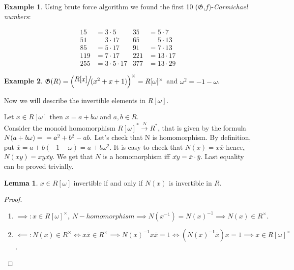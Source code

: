 \documentclass{article}
\theoremstyle{definition}
\newtheorem{example}{Example}
\theoremstyle{definition}
\newtheorem{lemma}{Lemma}
\begin{document}
\begin{example}
Using brute force algorithm we found the first 10 ($\mathfrak{G}$,$f$)-\textit{Carmichael numbers}:

$$\begin{aligned}
    15 &= 3 \cdot 5  \quad &35 &= 5 \cdot 7\\
    51 &= 3 \cdot 17 \quad &65 &= 5 \cdot 13\\
    85 &= 5 \cdot 17 \quad &91 &= 7 \cdot 13\\
    119 &= 7 \cdot 17 \quad &221 &= 13 \cdot 17\\
    255 &= 3 \cdot 5 \cdot 17 &377 &= 13 \cdot 29
    \end{aligned}$$

\end{example}

\begin{example}
    $\mathfrak{G}(R) = \Large{\left( \sfrac{R[x]}{ (x^2+x+1)}\right)^{\times}} = 
    R[\omega]^{\times}$ and $\omega^2 = -1 - \omega$.

Now we will describe the invertible elements in $R[\omega].$

    Let $x \in R[\omega]$ then $x = a + b\omega$ and $a, b \in R$.\\
    Consider the monoid homomorphism $R[\omega]^*  \xrightarrow{\ N\ } R^*$, that is given by the formula $N(a+b\omega) = \\ = a^2 + b^2 - ab.$
    Let's check that N is homomorphism.
    By definition, put $\overline{x} =  a + b(-1 - \omega) = a + b\omega^2 $. It is easy to check that $N(x) = x\overline{x}$ hence, $N(xy) = 
    xy\overline{xy}$.
    We get that $N$ is a homomorphism iff $\overline{xy} = \overline{x}\cdot\overline{y}.$
    Last equality can be proved trivially.

    \begin{lemma}
        $x \in R[\omega]$ invertible if and only if $N(x)$ is invertible in $R$.
    \end{lemma}

    
    \begin{proof}
    \hspace*{5cm}
    \begin{enumerate}
        \item $\implies: x \in R[\omega]^{\times},\ N - homomorphism \implies N(x^{-1}) = N(x)^{-1} \implies N(x)  \in R^{\times}.$
        \item $\impliedby:N(x) \in R^{\times} \iff x\overline{x} \in R^{\times} \implies N(x)^{-1}x\overline{x} = 1 \iff (N(x)^{-1}\overline{x})x = 1 \implies x \in R[\omega]^{\times}$.
    \end{enumerate}
    \end{proof}


\end{example}
\end{document}

